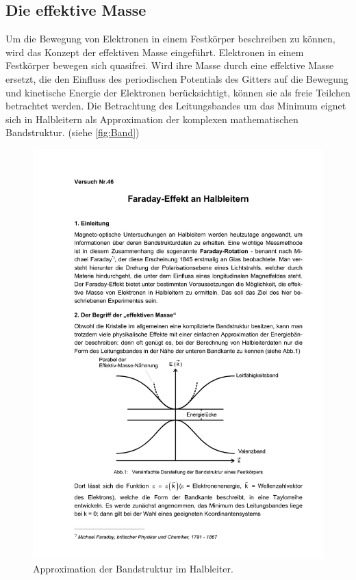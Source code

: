 \subsection{Die effektive Masse}
\label{sub:effektiv}
Um die Bewegung von Elektronen in einem Festkörper beschreiben zu können, wird das Konzept der effektiven Masse eingeführt.
Elektronen in einem Festkörper bewegen sich quasifrei. Wird ihre Masse durch eine effektive Masse ersetzt, die den Einfluss des
periodischen Potentials des Gitters auf die Bewegung und kinetische Energie der Elektronen berücksichtigt, können sie als freie
Teilchen betrachtet werden.
Die Betrachtung des Leitungsbandes um das Minimum eignet sich in Halbleitern als Approximation der komplexen mathematischen Bandstruktur.
(siehe \autoref{fig:Band})
\begin{figure}[H]
    \centering
    \includegraphics[scale=0.7]{Abbildungen/band.pdf}
    \caption{Approximation der Bandstruktur im Halbleiter.\cite{V46}}
    \label{fig:Band}
\end{figure}

